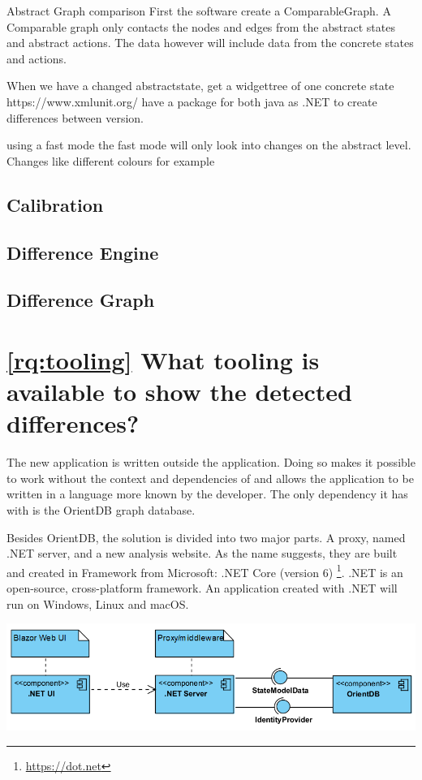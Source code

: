 Abstract Graph comparison
First the software create a ComparableGraph. A Comparable graph only contacts the nodes and edges from the abstract states and abstract actions. The data however will include data from the concrete states and actions. 

When we have a changed abstractstate, get a widgettree of one concrete state
https://www.xmlunit.org/  have a package for both java as .NET to create differences between version.

using a fast mode
the fast mode will only look into changes on the abstract level. Changes like different colours for example


\subsection{Calibration}
\subsection{Difference Engine}
\subsection{Difference Graph}


\section{\ref{rq:tooling} What tooling is available to show the detected differences?}
The new application is written outside the \testar application. Doing so makes it possible to work without the context and dependencies of \testar and allows the application to be written in a language more known by the developer. The only dependency it has with \testar is the OrientDB graph database.

Besides OrientDB, the solution is divided into two major parts. A \testar proxy, named .NET server, and a new \testar analysis website. As the name suggests, they are built and created in Framework from Microsoft: .NET Core (version 6) \footnote{\url{https://dot.net}}. .NET is an open-source, cross-platform framework. An application created with .NET will run on Windows, Linux and macOS. 

\begingroup
\captionsetup{type=figure}
\includegraphics[scale=0.7]{thesis/images/server-ui-comp.png}
\label{fig:components}
\endgroup

